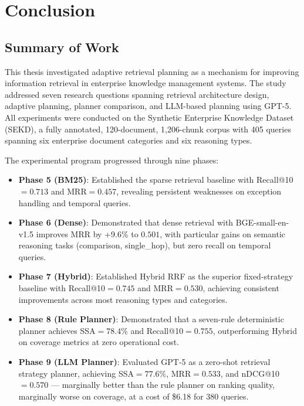 \chapter{Conclusion}
\label{chap:conclusion}

\section{Summary of Work}
\label{sec:conc_summary}

This thesis investigated adaptive retrieval planning as a mechanism for improving information retrieval in enterprise knowledge management systems. The study addressed seven research questions spanning retrieval architecture design, adaptive planning, planner comparison, and LLM-based planning using GPT-5. All experiments were conducted on the Synthetic Enterprise Knowledge Dataset (SEKD), a fully annotated, 120-document, 1,206-chunk corpus with 405 queries spanning six enterprise document categories and six reasoning types.

The experimental program progressed through nine phases:

\begin{itemize}
    \item \textbf{Phase 5 (BM25)}: Established the sparse retrieval baseline with Recall@10$={0.713}$ and MRR$={0.457}$, revealing persistent weaknesses on exception handling and temporal queries.
    \item \textbf{Phase 6 (Dense)}: Demonstrated that dense retrieval with BGE-small-en-v1.5 improves MRR by +9.6\% to $0.501$, with particular gains on semantic reasoning tasks (comparison, single\_hop), but zero recall on temporal queries.
    \item \textbf{Phase 7 (Hybrid)}: Established Hybrid RRF as the superior fixed-strategy baseline with Recall@10$={0.745}$ and MRR$={0.530}$, achieving consistent improvements across most reasoning types and categories.
    \item \textbf{Phase 8 (Rule Planner)}: Demonstrated that a seven-rule deterministic planner achieves SSA$={78.4\%}$ and Recall@10$={0.755}$, outperforming Hybrid on coverage metrics at zero operational cost.
    \item \textbf{Phase 9 (LLM Planner)}: Evaluated GPT-5 as a zero-shot retrieval strategy planner, achieving SSA$={77.6\%}$, MRR$={0.533}$, and nDCG@10$={0.570}$ --- marginally better than the rule planner on ranking quality, marginally worse on coverage, at a cost of \$6.18 for 380 queries.
\end{itemize}

